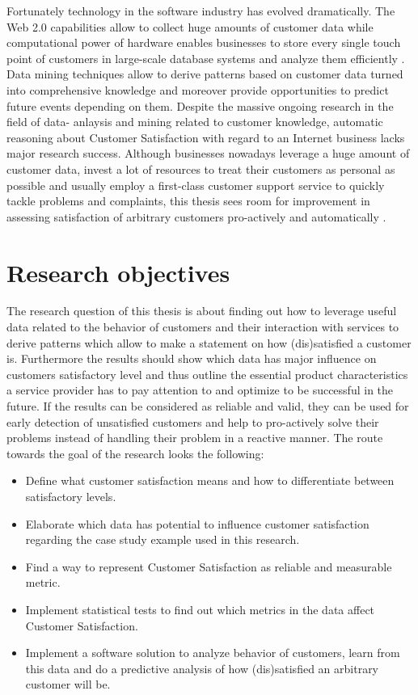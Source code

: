 Fortunately technology in the software industry has evolved dramatically. The Web 2.0 capabilities allow to collect huge amounts of customer data while computational power of hardware enables businesses to store every single touch point of customers in large-scale database systems and analyze them efficiently \cite{chen2003understanding} \cite{neckel2015}.  Data mining techniques allow to derive patterns based on customer data turned into comprehensive knowledge and moreover provide opportunities to predict future events depending on them. Despite the massive ongoing research in the field of data- anlaysis and mining related to customer knowledge, automatic reasoning about Customer Satisfaction with regard to an Internet business lacks major research success. Although businesses nowadays leverage a huge amount of customer data, invest a lot of resources to treat their customers as personal as possible and usually employ a first-class customer support service to quickly tackle problems and complaints, this thesis sees room for improvement in assessing satisfaction of arbitrary customers pro-actively and automatically \cite{neckel2015}.

\section{Research objectives}
The research question of this thesis is about finding out how to leverage useful data related to the behavior of customers and their interaction with services to derive patterns which allow to make a statement on how (dis)satisfied a customer is. Furthermore the results should show which data has major influence on customers satisfactory level and thus outline the essential product characteristics a service provider has to pay attention to and optimize to be successful in the future. If the results can be considered as reliable and valid, they can be used for early detection of unsatisfied customers and help to pro-actively solve their problems instead of handling their problem in a reactive manner.
The route towards the goal of the research looks the following:

\begin{itemize}
	\item Define what customer satisfaction means and how to differentiate between satisfactory levels.
	\item Elaborate which data has potential to influence customer satisfaction regarding the case study example used in this research. 
	\item Find a way to represent Customer Satisfaction as reliable and measurable metric.
	\item Implement statistical tests to find out which metrics in the data affect Customer Satisfaction. 
	\item Implement a software solution to analyze behavior of customers, learn from this data and do a predictive analysis of how (dis)satisfied an arbitrary customer will be.
\end{itemize}

